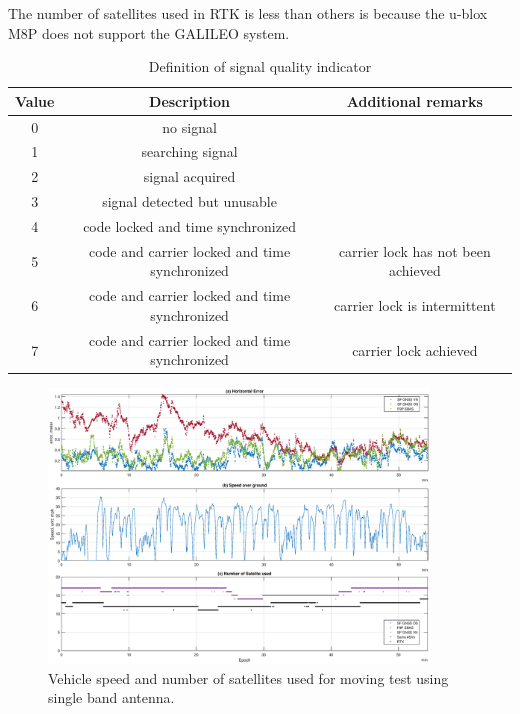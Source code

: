 \documentclass[letterpaper, 10 pt,onecolumn]{article}
\begin{document}
	The number of satellites used in RTK is less than others is because the u-blox M8P does not support the GALILEO system.
	
	\begin{table}[H]
		\centering
		\begin{tabular}{|c|c|c|}
			\hline
			Value & Description                                   & Additional remarks                 \\ \hline
			0     & no signal                                     &                                    \\ \hline
			1     & searching signal                              &                                    \\ \hline
			2     & signal acquired                               &                                    \\ \hline
			3     & signal detected but unusable                  &                                    \\ \hline
			4     & code locked and time synchronized             &                                    \\ \hline
			5     & code and carrier locked and time synchronized & carrier lock has not been achieved \\ \hline
			6     & code and carrier locked and time synchronized & carrier lock is intermittent       \\ \hline
			7     & code and carrier locked and time synchronized & carrier lock achieved              \\ \hline
		\end{tabular}
		\label{tab:qi}
		\caption{Definition of signal quality indicator}
	\end{table}
	
	\begin{figure}[H]
		\centering
		\includegraphics[width=0.9\textwidth]{figures/dynamicinfo_single.eps}
		\caption{Vehicle speed and number of satellites used for moving test using single band antenna.}
		\label{fig:m1vspeed}
	\end{figure}
\end{document}
